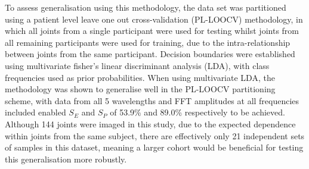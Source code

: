 \documentclass[twoside]{bhamthesis}
\theoremstyle{definition}
\begin{document}
To assess generalisation using this methodology, the data set was partitioned using a patient level leave one out cross-validation (PL-LOOCV) methodology, in which all joints from a single participant were used for testing whilst joints from all remaining participants were used for training, due to the intra-relationship between joints from the same participant. Decision boundaries were established using multivariate fisher's linear discriminant analysis (LDA), with class frequencies used as prior probabilities. When using multivariate LDA, the methodology was shown to generalise well in the PL-LOOCV partitioning scheme, with data from all 5 wavelengths and FFT amplitudes at all frequencies included enabled $S_E$ and $S_P$ of 53.9\% and 89.0\% respectively to be achieved. Although 144 joints were imaged in this study, due to the expected dependence within joints from the same subject, there are effectively only 21 independent sets of samples in this dataset, meaning a larger cohort would be beneficial for testing this generalisation more robustly.



 


\end{document}
